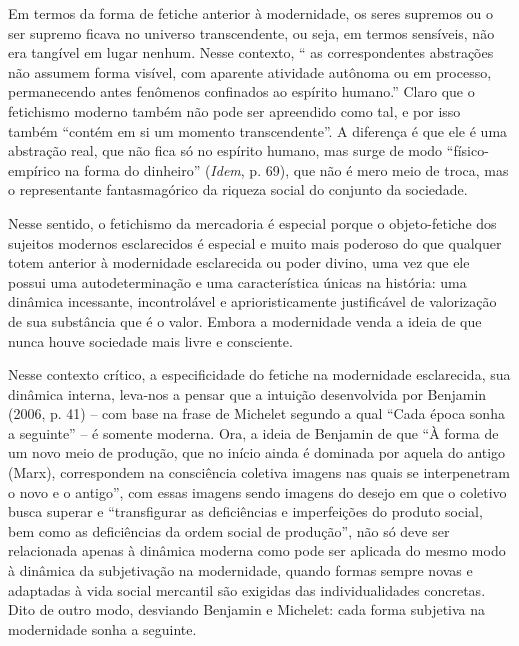 Em termos da forma de fetiche anterior à modernidade, os seres supremos
ou o ser supremo ficava no universo transcendente, ou seja, em termos
sensíveis, não era tangível em lugar nenhum. Nesse contexto, `` as
correspondentes abstrações não assumem forma visível, com aparente
atividade autônoma ou em processo, permanecendo antes fenômenos
confinados ao espírito humano.'' Claro que o fetichismo moderno também
não pode ser apreendido como tal, e por isso também ``contém em si um
momento transcendente''. A diferença é que ele é uma abstração real, que
não fica só no espírito humano, mas surge de modo ``físico-empírico na
forma do dinheiro'' (\emph{Idem}, p. 69), que não é mero meio de troca,
mas o representante fantasmagórico da riqueza social do conjunto da
sociedade.

Nesse sentido, o fetichismo da mercadoria é especial porque o
objeto-fetiche dos sujeitos modernos esclarecidos é especial e muito
mais poderoso do que qualquer totem anterior à modernidade esclarecida
ou poder divino, uma vez que ele possui uma autodeterminação e uma
característica únicas na história: uma dinâmica incessante,
incontrolável e aprioristicamente justificável de valorização de sua
substância que é o valor. Embora a modernidade venda a ideia de que
nunca houve sociedade mais livre e consciente.

Nesse contexto crítico, a especificidade do fetiche na modernidade
esclarecida, sua dinâmica interna, leva-nos a pensar que a intuição
desenvolvida por Benjamin (2006, p. 41) -- com base na frase de Michelet
segundo a qual ``Cada época sonha a seguinte'' -- é somente moderna.
Ora, a ideia de Benjamin de que ``À forma de um novo meio de produção,
que no início ainda é dominada por aquela do antigo (Marx), correspondem
na consciência coletiva imagens nas quais se interpenetram o novo e o
antigo'', com essas imagens sendo imagens do desejo em que o coletivo
busca superar e ``transfigurar as deficiências e imperfeições do produto
social, bem como as deficiências da ordem social de produção'', não só
deve ser relacionada apenas à dinâmica moderna como pode ser aplicada do
mesmo modo à dinâmica da subjetivação na modernidade, quando formas
sempre novas e adaptadas à vida social mercantil são exigidas das
individualidades concretas. Dito de outro modo, desviando Benjamin e
Michelet: cada forma subjetiva na modernidade sonha a seguinte.

